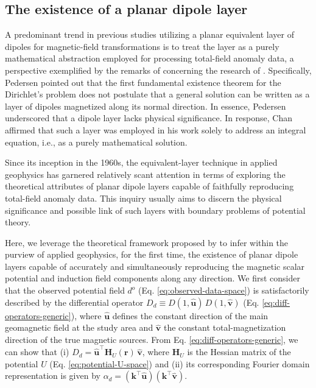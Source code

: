 \subsection{The existence of a planar dipole layer}

A predominant trend in previous studies utilizing a planar equivalent layer of dipoles for 
magnetic-field transformations 
is to treat the layer as a purely mathematical abstraction employed for processing total-field 
anomaly data, a perspective exemplified by the remarks of \cite{pedersen1989} concerning the 
research of \cite{bhattacharyya_chan1977}.
Specifically, Pedersen pointed out that the first fundamental existence theorem for the 
Dirichlet's problem does not postulate that a general solution can be written as a layer of 
dipoles magnetized along its 
normal direction. In essence, Pedersen underscored that a dipole layer lacks physical 
significance.
In response, Chan affirmed that such a layer was employed in his work 
solely to address an integral equation, i.e., as a purely mathematical solution.

Since its inception in the 1960s, the equivalent-layer technique in applied geophysics has 
garnered relatively scant attention in terms of exploring the theoretical attributes of planar 
dipole layers capable of faithfully reproducing total-field anomaly data. 
This inquiry usually aims to discern the physical significance and possible link of such 
layers with boundary problems of potential theory.

Here, we leverage the theoretical framework proposed by \cite{oliveirajr_etal2026_1} to infer 
within the purview of applied geophysics, for the first time, the existence of planar dipole 
layers capable of accurately and simultaneously reproducing the magnetic scalar potential and 
induction field components along any direction.
We first consider that the observed potential field $d^{o}$ (Eq. 
\ref{eq:observed-data-space}) is satisfactorily described by the differential operator 
$D_{d} \equiv D(1, \hat{\mathbf{u}}) \, D(1, \hat{\mathbf{v}})$
(Eq. \ref{eq:diff-operators-generic}), where $\hat{\mathbf{u}}$ defines the constant 
direction of the main geomagnetic field at the study area and $\hat{\mathbf{v}}$ the constant 
total-magnetization direction of the true magnetic sources.
From Eq. \ref{eq:diff-operators-generic}, we can show that 
(i) $D_{d} = \hat{\mathbf{u}}^{\top} \mathbf{H}_{U}(\mathbf{r}) \, \hat{\mathbf{v}}$,
where $\mathbf{H}_{U}$ is the Hessian matrix \citep[e.g.,][p. 158]{kaplan2002} of
the potential $U$ (Eq. \ref{eq:potential-U-space}) and (ii) its corresponding 
Fourier domain representation is given by 
$\alpha_{d} = \left(\mathbf{k}^{\top} \hat{\mathbf{u}} \right)\left(\mathbf{k}^{\top} \hat{\mathbf{v}} \right)$.

